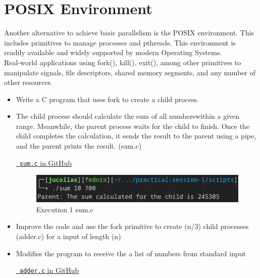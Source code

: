 \documentclass[12pt]{article}
\begin{document}
\section{POSIX Environment}

Another alternative to achieve basic parallelism is the POSIX
environment. This includes primitives to manage processes and
pthreads. This environment is readily available and widely supported
by modern Operating Systems.\\

Real-world applications using fork(), kill(), exit(), among other
primitives to manipulate signals, file descriptors, shared memory
segments, and any number of other resources.

\begin{itemize}
\item Write a C program that uses fork to create a child process.
\item The child process should calculate the sum of all numberswithin a given range. Meanwhile, the parent process waits for the child to finish. Once the child completes the calculation, it sends the result to the parent using a pipe, and the parent prints the result. (sum.c)

\begin{center}
    \href{https://github.com/jucollas/parallel-programming/blob/main/practical-session-1/scripts/cfiles/sum.c}{\faGithub\ \texttt{sum.c} in GitHub}
\end{center}


\begin{figure}[H]
    \centering
    \includegraphics[width=0.8\linewidth]{images/sum-execute1.png}
    \caption{Execution 1 sum.c}
\end{figure}

\item Improve the code and use the fork primitive to create (n/3) child processes (adder.c) for a input of length (n)
\item Modifies the program to receive the a list of numbers from standard input

\begin{center}
    \href{https://github.com/jucollas/parallel-programming/blob/main/practical-session-1/scripts/cfiles/adder.c}{\faGithub\ \texttt{adder.c} in GitHub}
\end{center}


\end{itemize}
\end{document}
